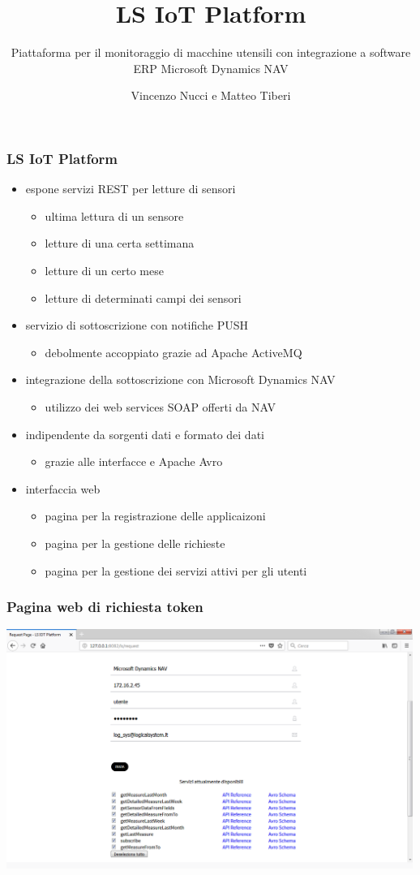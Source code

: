 \documentclass{beamer}
\title{LS IoT Platform}
\subtitle{Piattaforma per il monitoraggio di macchine utensili con integrazione a software ERP Microsoft Dynamics NAV}
\author{Vincenzo Nucci e Matteo Tiberi}
\institute{Università di Camerino}
\begin{document}
	\begin{frame}
		\titlepage
	\end{frame}

\begin{frame}
\frametitle{LS IoT Platform}
	\begin{itemize}
		\item espone servizi REST per letture di sensori
		\begin{itemize}
			\item ultima lettura di un sensore
			\item letture di una certa settimana
			\item letture di un certo mese
			\item letture di determinati campi dei sensori
		\end{itemize}
		\item servizio di sottoscrizione con notifiche PUSH
		\begin{itemize}
			\item debolmente accoppiato grazie ad Apache ActiveMQ
		\end{itemize}
		\item integrazione della sottoscrizione con Microsoft Dynamics NAV
		\begin{itemize}
			\item utilizzo dei web services SOAP offerti da NAV
		\end{itemize}
		\item indipendente da sorgenti dati e formato dei dati
		\begin{itemize}
			\item grazie alle interfacce e Apache Avro
		\end{itemize}
		\item interfaccia web
		\begin{itemize}
			\item pagina per la registrazione delle applicaizoni
			\item pagina per la gestione delle richieste
			\item pagina per la gestione dei servizi attivi per gli utenti
		\end{itemize}
	\end{itemize}
\end{frame}

\begin{frame}
\frametitle{Pagina web di richiesta token}
\includegraphics[width=1\textwidth]{images/RequestPagePlatform.png}
\end{frame}
\end{document}
